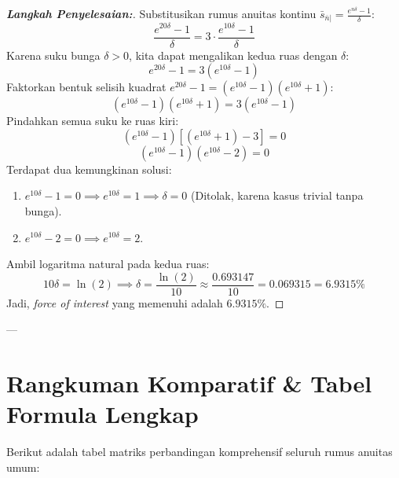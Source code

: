 \documentclass[11pt,a4paper]{article}
\begin{document}
\begin{proof}[\textbf{Langkah Penyelesaian:}]
Substitusikan rumus anuitas kontinu $\bar{s}_{\overline{n}|} = \frac{e^{n\delta} - 1}{\delta}$:
\begin{equation*}
    \frac{e^{20\delta} - 1}{\delta} = 3 \cdot \frac{e^{10\delta} - 1}{\delta}
\end{equation*}
Karena suku bunga $\delta > 0$, kita dapat mengalikan kedua ruas dengan $\delta$:
\begin{equation*}
    e^{20\delta} - 1 = 3 (e^{10\delta} - 1)
\end{equation*}
Faktorkan bentuk selisih kuadrat $e^{20\delta} - 1 = (e^{10\delta} - 1)(e^{10\delta} + 1)$:
\begin{equation*}
    (e^{10\delta} - 1)(e^{10\delta} + 1) = 3 (e^{10\delta} - 1)
\end{equation*}
Pindahkan semua suku ke ruas kiri:
\begin{equation*}
    (e^{10\delta} - 1)\left[ (e^{10\delta} + 1) - 3 \right] = 0
\end{equation*}
\begin{equation*}
    (e^{10\delta} - 1)(e^{10\delta} - 2) = 0
\end{equation*}
Terdapat dua kemungkinan solusi:
\begin{enumerate}
    \item $e^{10\delta} - 1 = 0 \implies e^{10\delta} = 1 \implies \delta = 0$ (Ditolak, karena kasus trivial tanpa bunga).
    \item $e^{10\delta} - 2 = 0 \implies e^{10\delta} = 2$.
\end{enumerate}
Ambil logaritma natural pada kedua ruas:
\begin{equation*}
    10\delta = \ln(2) \implies \delta = \frac{\ln(2)}{10} \approx \frac{0.693147}{10} = \mathbf{0.069315} = \mathbf{6.9315\%}
\end{equation*}
Jadi, \textit{force of interest} yang memenuhi adalah $\mathbf{6.9315\%}$.
\end{proof}

---

\section{Rangkuman Komparatif \& Tabel Formula Lengkap}

Berikut adalah tabel matriks perbandingan komprehensif seluruh rumus anuitas umum:
\end{document}
